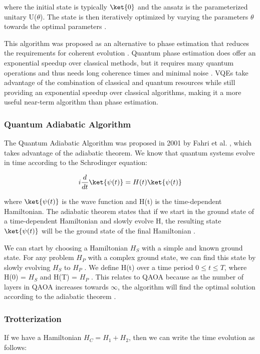 where the initial state is typically $\ket{0}$ and the ansatz is the parameterized unitary U($\theta$). The state is then iteratively optimized by varying the parameters $\theta$ towards the optimal parameters \cite{vqeReview}.

This algorithm was proposed as an alternative to phase estimation that reduces the requirements for coherent evolution \cite{vqe2014}. Quantum phase estimation does offer an exponential speedup over classical methods, but it requires many quantum operations and thus needs long coherence times and minimal noise \cite{vqe2014}. VQEs take advantage of the combination of classical and quantum resources while still providing an exponential speedup over classical algorithms, making it a more useful near-term algorithm than phase estimation. 

\subsubsection{Quantum Adiabatic Algorithm}
The Quantum Adiabatic Algorithm was proposed in 2001 by Fahri et al. \cite{qaa2001}, which takes advantage of the adiabatic theorem. We know that quantum systems evolve in time according to the Schrodinger equation:

\begin{equation} 
        i \frac{d}{dt} \ket{\psi(t)} = H(t) \ket{\psi(t)}
    \end{equation}

where $\ket{\psi(t)}$ is the wave function and H(t) is the time-dependent Hamiltonian. The adiabatic theorem states that if we start in the ground state of a time-dependent Hamiltonian and slowly evolve H, the resulting state $\ket{\psi(t)}$ will be the ground state of the final Hamiltonian \cite{qaa2001}.

We can start by choosing a Hamiltonian $H_S$ with a simple and known ground state. For any problem $H_P$ with a complex ground state, we can find this state by slowly evolving $H_S$ to $H_P$ \cite{qaa2001}. We define H(t) over a time period $0 \leq t \leq T$, where H(0) = $H_S$ and H(T) = $H_P$ \cite{qaa2001}. This relates to QAOA because as the number of layers in QAOA increases towards $\infty$, the algorithm will find the optimal solution according to the adiabatic theorem \cite{farhiQAOA}.

\subsubsection{Trotterization}
If we have a Hamiltonian $H_C = H_1 + H_2$, then we can write the time evolution as follows:

